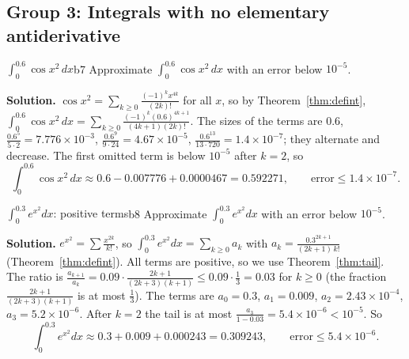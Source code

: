 \documentclass[11pt]{article}
\begin{document}
\subsection*{Group 3: Integrals with no elementary antiderivative}

\begin{exmp}{$\int_0^{0.6}\cos x^2\,dx$}{b7}
Approximate $\displaystyle\int_0^{0.6}\cos x^2\,dx$ with an error below $10^{-5}$.

\textbf{Solution.} $\cos x^2=\sum_{k\ge0}\frac{(-1)^kx^{4k}}{(2k)!}$ for all $x$, so by Theorem~\ref{thm:defint}, $\int_0^{0.6}\cos x^2\,dx=\sum_{k\ge0}\frac{(-1)^k(0.6)^{4k+1}}{(4k+1)(2k)!}$. The sizes of the terms are $0.6$, $\frac{0.6^5}{5\cdot2}=7.776\times10^{-3}$, $\frac{0.6^9}{9\cdot24}=4.67\times10^{-5}$, $\frac{0.6^{13}}{13\cdot720}=1.4\times10^{-7}$; they alternate and decrease. The first omitted term is below $10^{-5}$ after $k=2$, so
\[
\int_0^{0.6}\cos x^2\,dx\approx0.6-0.007776+0.0000467=0.592271,\qquad\text{error}\le1.4\times10^{-7}.
\]
\end{exmp}

\begin{exmp}{$\int_0^{0.3}e^{x^2}dx$: positive terms}{b8}
Approximate $\displaystyle\int_0^{0.3}e^{x^2}dx$ with an error below $10^{-5}$.

\textbf{Solution.} $e^{x^2}=\sum\frac{x^{2k}}{k!}$, so $\int_0^{0.3}e^{x^2}dx=\sum_{k\ge0}a_k$ with $a_k=\frac{0.3^{2k+1}}{(2k+1)\,k!}$ (Theorem~\ref{thm:defint}). All terms are positive, so we use Theorem~\ref{thm:tail}. The ratio is $\frac{a_{k+1}}{a_k}=0.09\cdot\frac{2k+1}{(2k+3)(k+1)}\le0.09\cdot\frac13=0.03$ for $k\ge0$ (the fraction $\frac{2k+1}{(2k+3)(k+1)}$ is at most $\frac13$). The terms are $a_0=0.3$, $a_1=0.009$, $a_2=2.43\times10^{-4}$, $a_3=5.2\times10^{-6}$. After $k=2$ the tail is at most $\frac{a_3}{1-0.03}=5.4\times10^{-6}<10^{-5}$. So
\[
\int_0^{0.3}e^{x^2}dx\approx0.3+0.009+0.000243=0.309243,\qquad\text{error}\le5.4\times10^{-6}.
\]
\end{exmp}
\end{document}
